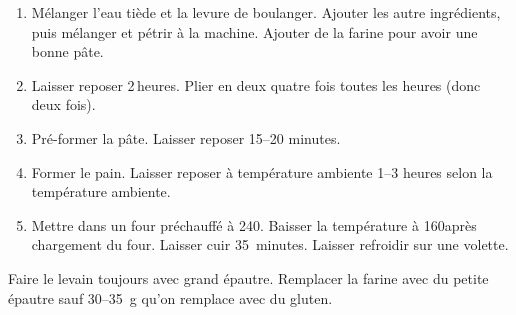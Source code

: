 
\begin{ingredients}
\end{ingredients}


\begin{recipe}
  \begin{enumerate}

  \item Mélanger l'eau tiède et la levure de boulanger.  Ajouter les
    autre ingrédients, puis mélanger et pétrir à la machine.  Ajouter
    de la farine pour avoir une bonne pâte.
    
  \item Laisser reposer 2$\,$\fracH heures.  Plier en deux quatre fois toutes
    les heures (donc deux fois).
    
  \item Pré-former la pâte.  Laisser reposer 15--20 minutes.
    
  \item Former le pain.  Laisser reposer à température ambiente 1--3
    heures selon la température ambiente.
    
  \item Mettre dans un four préchauffé à 240\degreeC.  Baisser la
    température à 160\degreeC après chargement du four.  Laisser cuir
    35~minutes.  Laisser refroidir sur une volette.

  \end{enumerate}
\end{recipe}


Faire le levain toujours avec grand épautre.
Remplacer la farine avec du petite épautre sauf 30--35~g qu'on
remplace avec du gluten.


